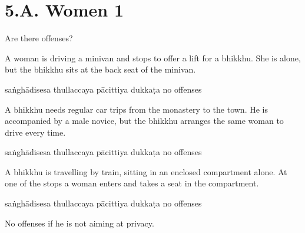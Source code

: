 \chapter{5.A. Women 1}
\renewcommand*{\theChapterTitle}{5.A. Women 1}

\begin{exam}{\autoExamName}

\begin{problem*}

Are there offenses?

\begin{parts}

\item A woman is driving a minivan and stops to offer a lift for a bhikkhu.
  She is alone, but the bhikkhu sits at the back seat of the minivan.

  \bigskip

  \begin{answers}{5}
    \bChoices
     saṅghādisesa\eAns
     thullaccaya\eAns
     pācittiya\eAns
     dukkaṭa\eAns
     no offenses\eAns
    \eChoices
  \end{answers}

  \bigskip

\item A bhikkhu needs regular car trips from the monastery to the town. He is
  accompanied by a male novice, but the bhikkhu arranges the same woman to drive
  every time.

  \bigskip

  \begin{answers}{5}
    \bChoices
     saṅghādisesa\eAns
     thullaccaya\eAns
     pācittiya\eAns
     dukkaṭa\eAns
     no offenses\eAns
    \eChoices
  \end{answers}

  \bigskip

\item A bhikkhu is travelling by train, sitting in an enclosed compartment alone.
  At one of the stops a woman enters and takes a seat in the compartment.

  \bigskip

  \begin{answers}{5}
    \bChoices
     saṅghādisesa\eAns
     thullaccaya\eAns
     pācittiya\eAns
     dukkaṭa\eAns
     no offenses\eAns
    \eChoices
  \end{answers}

  \begin{solution}
    No offenses if he is not aiming at privacy.
  \end{solution}


\end{parts}
\end{problem*}
\end{exam}
